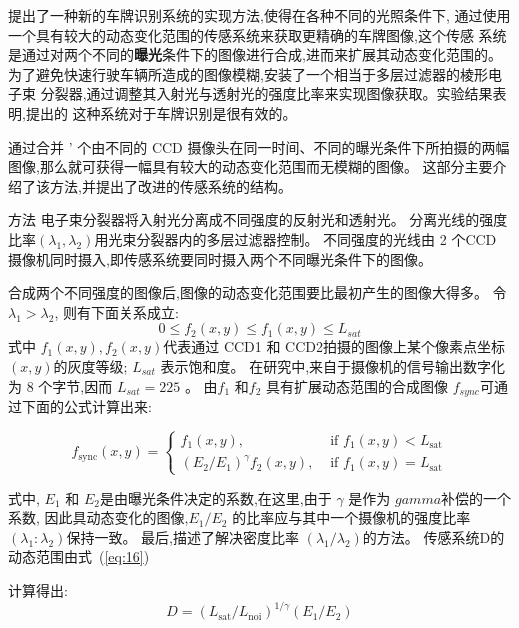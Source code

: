 \documentclass{amsart}
\begin{document}
\cite{张芮}提出了一种新的车牌识别系统的实现方法,使得在各种不同的光照条件下,
通过使用一个具有较大的动态变化范围的传感系统来获取更精确的车牌图像,这个传感
系统是通过对两个不同的\textbf{曝光}条件下的图像进行合成,进而来扩展其动态变化范围的。
为了避免快速行驶车辆所造成的图像模糊,安装了一个相当于多层过滤器的棱形电子束
分裂器,通过调整其入射光与透射光的强度比率来实现图像获取。实验结果表明,提出的
这种系统对于车牌识别是很有效的。

通过合并 ’ 个由不同的 CCD 摄像头在同一时间、不同的曝光条件下所拍摄的两幅图像,那么就可获得一幅具有较大的动态变化范围而无模糊的图像。
这部分主要介绍了该方法,并提出了改进的传感系统的结构。

方法 电子束分裂器将入射光分离成不同强度的反射光和透射光。
分离光线的强度比率$(\lambda_1,\lambda_2)$用光束分裂器内的多层过滤器控制。
不同强度的光线由 2 个CCD 摄像机同时摄入,即传感系统要同时摄入两个不同曝光条件下的图像。

合成两个不同强度的图像后,图像的动态变化范围要比最初产生的图像大得多。
令$\lambda_1>\lambda_2$,
则有下面关系成立:
\begin{equation}
  \label{eq:14}
0 \leq f_2(x,y) \leq f_1(x,y) \leq L_{sat}
\end{equation}
式中 $f_1(x,y),f_2(x,y)$代表通过 CCD1 和 CCD2拍摄的图像上某个像素点坐标$(x,y)$的灰度等级;
$ L_{sat}$ 表示饱和度。
在研究中,来自于摄像机的信号输出数字化为 8 个字节,因而 $ L_{sat}=225$ 。
由$f_1$ 和$f_2$ 具有扩展动态范围的合成图像 $f_{sync}$可通过下面的公式计算出来:

\begin{equation}
  \label{eq:15}
  f_{\mathrm{sync}}(x, y)=\left\{\begin{array}{cl}
f_{1}(x, y), & \text { if } f_{1}(x, y)<L_{\mathrm{sat}} \\
\left(E_{2} / E_{1}\right)^{\gamma} f_{2}(x, y), & \text { if } f_{1}(x, y)=L_{\mathrm{sat}}
\end{array}\right.
\end{equation}

式中, $E_1$ 和 $E_2$是由曝光条件决定的系数,在这里,由于 $\gamma$ 是作为 $gamma$补偿的一个系数,
因此具动态变化的图像,$E_1/E_2$ 的比率应与其中一个摄像机的强度比率
$(\lambda_1:\lambda_2 )$保持一致。
最后,描述了解决密度比率 $(\lambda_1/\lambda_2)$的方法。
传感系统D的动态范围由式~(\ref{eq:16})

计算得出:
\begin{equation}
  \label{eq:16}
D=\left(L_{\mathrm{sat}} / L_{\mathrm{noi}}\right)^{1 / \gamma}\left(E_{1} / E_{2}\right)
\end{equation}
\end{document}
